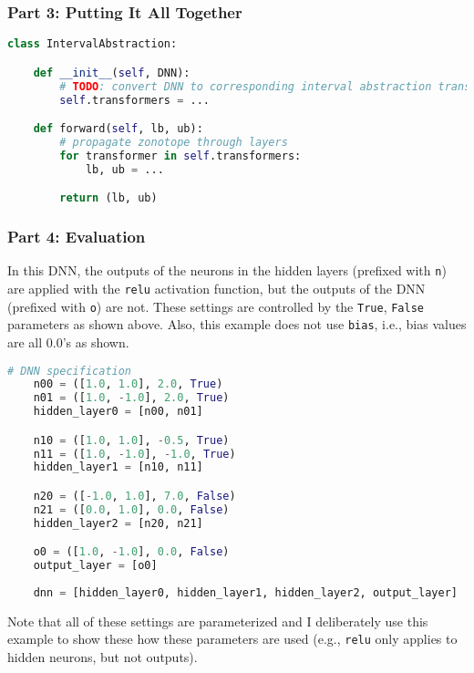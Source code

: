 \subsubsection{Part 3: Putting It All Together}

\begin{lstlisting}[language=Python]
class IntervalAbstraction:

    def __init__(self, DNN):
        # TODO: convert DNN to corresponding interval abstraction transformers
        self.transformers = ...

    def forward(self, lb, ub):
        # propagate zonotope through layers
        for transformer in self.transformers:
            lb, ub = ...

        return (lb, ub)

\end{lstlisting}

\subsubsection{Part 4: Evaluation}

In this DNN, the outputs of the neurons in the hidden layers (prefixed with \texttt{n}) are applied with the \texttt{relu} activation function, but the outputs of the DNN (prefixed with \texttt{o}) are not.  These settings are controlled by the \texttt{True}, \texttt{False} parameters as shown above.  Also, this example does not use \texttt{bias}, i.e., bias values are all 0.0's as shown. 

\begin{lstlisting}[language=Python]
    # DNN specification
    n00 = ([1.0, 1.0], 2.0, True)
    n01 = ([1.0, -1.0], 2.0, True)
    hidden_layer0 = [n00, n01]

    n10 = ([1.0, 1.0], -0.5, True)
    n11 = ([1.0, -1.0], -1.0, True)
    hidden_layer1 = [n10, n11]

    n20 = ([-1.0, 1.0], 7.0, False)
    n21 = ([0.0, 1.0], 0.0, False)
    hidden_layer2 = [n20, n21]

    o0 = ([1.0, -1.0], 0.0, False)
    output_layer = [o0]
    
    dnn = [hidden_layer0, hidden_layer1, hidden_layer2, output_layer]
\end{lstlisting}

Note that all of these settings are parameterized and I deliberately use this example to show these how these parameters are used (e.g., \texttt{relu} only applies to hidden neurons, but not outputs).


